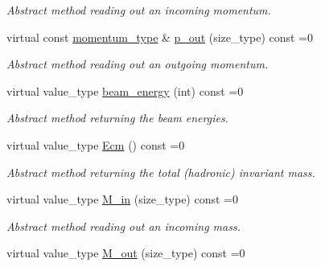 \begin{DoxyCompactItemize}
\begin{DoxyCompactList}\small\item\em Abstract method reading out an incoming momentum. \end{DoxyCompactList}\item 
\hypertarget{a00442_aecdc8567f2e5cd0f2e7a7660f2a06722}{virtual const \hyperlink{a00559}{momentum\-\_\-type} \& \hyperlink{a00442_aecdc8567f2e5cd0f2e7a7660f2a06722}{p\-\_\-out} (size\-\_\-type) const =0}\label{a00442_aecdc8567f2e5cd0f2e7a7660f2a06722}

\begin{DoxyCompactList}\small\item\em Abstract method reading out an outgoing momentum. \end{DoxyCompactList}\item 
\hypertarget{a00442_aa5b9b0753a4f607517c5fcf26d82c921}{virtual value\-\_\-type \hyperlink{a00442_aa5b9b0753a4f607517c5fcf26d82c921}{beam\-\_\-energy} (int) const =0}\label{a00442_aa5b9b0753a4f607517c5fcf26d82c921}

\begin{DoxyCompactList}\small\item\em Abstract method returning the beam energies. \end{DoxyCompactList}\item 
\hypertarget{a00442_ac7c94ec848706882d18ee5983ee6c205}{virtual value\-\_\-type \hyperlink{a00442_ac7c94ec848706882d18ee5983ee6c205}{Ecm} () const =0}\label{a00442_ac7c94ec848706882d18ee5983ee6c205}

\begin{DoxyCompactList}\small\item\em Abstract method returning the total (hadronic) invariant mass. \end{DoxyCompactList}\item 
\hypertarget{a00442_a303558afdb7b6b704399fa5dd8bc9f30}{virtual value\-\_\-type \hyperlink{a00442_a303558afdb7b6b704399fa5dd8bc9f30}{M\-\_\-in} (size\-\_\-type) const =0}\label{a00442_a303558afdb7b6b704399fa5dd8bc9f30}

\begin{DoxyCompactList}\small\item\em Abstract method reading out an incoming mass. \end{DoxyCompactList}\item 
\hypertarget{a00442_a9f39b8a4fceb86b5cb3e669c77ccf62d}{virtual value\-\_\-type \hyperlink{a00442_a9f39b8a4fceb86b5cb3e669c77ccf62d}{M\-\_\-out} (size\-\_\-type) const =0}\label{a00442_a9f39b8a4fceb86b5cb3e669c77ccf62d}


\end{DoxyCompactItemize}
